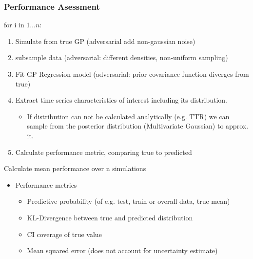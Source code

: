 \documentclass[
	8pt, %
]{beamer}
\begin{document}
\begin{frame}
	\frametitle{Performance Asessment}
		for i in $1 \dots n$:
		\begin{enumerate}
			\item Simulate from true GP (adversarial add non-gaussian noise)
			\item subsample data (adversarial: different densities, non-uniform sampling)
			\item Fit GP-Regression model (adversarial: prior covariance function diverges from true)
			\item Extract time series characteristics of interest including its distribution.
				\begin{itemize}
					\item If distribution can not be calculated analytically (e.g. TTR) we can
					sample from the posterior distribution (Multivariate Gaussian) to approx. it.
				\end{itemize}
			\item Calculate performance metric, comparing true to predicted
		\end{enumerate}
	\smallskip
	Calculate mean performance over n simulations

	\bigskip %

	\begin{itemize}
		\item Performance metrics
		\begin{itemize}
			\item Predictive probability (of e.g. test, train or overall data, true mean)
			\item KL-Divergence between true and predicted distribution
			\item CI coverage of true value
			\item Mean squared error (does not account for uncertainty estimate)
		\end{itemize}
	\end{itemize}

\end{frame}
\end{document}
